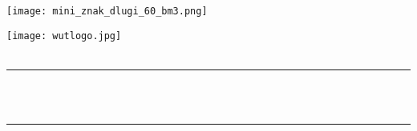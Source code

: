 \begin{titlepage}
	\centering
	\vspace*{0.5 cm}
	
	\texttt{[image: mini\_znak\_dlugi\_60\_bm3.png]} \\
	\hfill \break

	\texttt{[image: wutlogo.jpg]}\\[1.0 cm]
	\textsc{\large \course}\\[0.5 cm]
	\rule{\linewidth}{0.2 mm} \\[0.4 cm]
	{ \Large \bfseries \thetitle}\\
	\rule{\linewidth}{0.2 mm} \\[1.5 cm]
	
	\begin{minipage}{0.9\textwidth}
		\begin{flushleft} \large
			\\
			\theauthor
		\end{flushleft}
	\end{minipage}~
	\\[1 cm]
	{\large \thedate}\\[2 cm]
	\vfill
\end{titlepage}